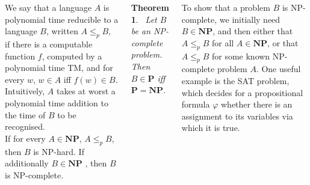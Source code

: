 \documentclass{tikzposter} %
\newtheorem{theorem}{Theorem}
\begin{document}
\begin{columns}
{{        We say that a language $A$ is polynomial time reducible to a language $B$, written $A \le_{p} B$, if there is a computable function $f$, computed by a polynomial time TM, and for every $w$, $w \in A$ iff $f(w) \in B$. Intuitively, $A$ takes at worst a polynomial time addition to the time of $B$ to be recognised.\\

        If for every $A \in \mathbf{NP}$, $A \le_{p} B$, then $B$ is NP-hard. If additionally $B \in \mathbf{NP}$ , then $B$ is NP-complete. \\

        \begin{theorem}
        \ Let $B$ be an NP-complete problem. Then $B \in \mathbf{P}$ iff $\mathbf{P} = \mathbf{NP}$.
        \end{theorem}
        \hphantom{}

        To show that a problem $B$ is NP-complete, we initially need $B \in \mathbf{NP}$, and then either that $A \le_{p} B$ for all $A \in \mathbf{NP}$, or that $A \le_{p} B$ for some known NP-complete problem $A$. One useful example is the SAT problem, which decides for a propositional formula $\varphi$ whether there is an assignment to its variables via which it is true.
      }
      }

\end{columns}
\end{document}
